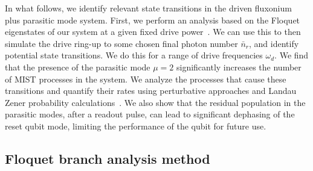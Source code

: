 \documentclass[%
reprint,
superscriptaddress,
 amsmath,amssymb,
 aps,
 prx,
longbibliography,
floatfix,
]{revtex4-2}
\begin{document}
In what follows, we identify relevant state transitions in the driven fluxonium plus parasitic mode system. First, we perform an analysis based on the Floquet eigenstates of our system at a given fixed drive power~\cite{khezri2023measurement,cohen2023reminiscence,dumas2024unified}. We can use this to then simulate the drive ring-up to some chosen final photon number $\bar{n}_r$, and identify potential state transitions.  We do this for a range of drive frequencies $\omega_d$. We find that the presence of the parasitic mode $\mu=2$ significantly increases the number of MIST processes in the system. We analyze the processes that cause these transitions and quantify their rates using perturbative approaches and Landau Zener probability calculations~\cite{ikeda2022floquet}. We also show that the residual population in the parasitic modes, after a readout pulse, can lead to significant dephasing of the reset qubit mode, limiting the performance of the qubit for future use.

\subsection{Floquet branch analysis method} 
\end{document}
